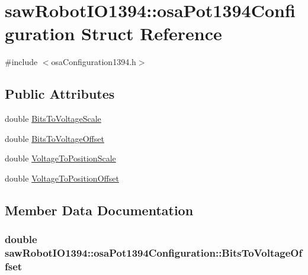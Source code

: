 \hypertarget{structsaw_robot_i_o1394_1_1osa_pot1394_configuration}{}\section{saw\+Robot\+I\+O1394\+:\+:osa\+Pot1394\+Configuration Struct Reference}
\label{structsaw_robot_i_o1394_1_1osa_pot1394_configuration}


{\ttfamily \#include $<$osa\+Configuration1394.\+h$>$}

\subsection*{Public Attributes}
\begin{DoxyCompactItemize}
\item 
double \hyperlink{structsaw_robot_i_o1394_1_1osa_pot1394_configuration_ac5a3c1c05766de6b45c1b5b601c11700}{Bits\+To\+Voltage\+Scale}
\item 
double \hyperlink{structsaw_robot_i_o1394_1_1osa_pot1394_configuration_a0f4fcc3908521910bde14dbe68436833}{Bits\+To\+Voltage\+Offset}
\item 
double \hyperlink{structsaw_robot_i_o1394_1_1osa_pot1394_configuration_adc6b92026b60d4e3dd108a6acc805e4c}{Voltage\+To\+Position\+Scale}
\item 
double \hyperlink{structsaw_robot_i_o1394_1_1osa_pot1394_configuration_a770016798ff462addf14c30b3745f200}{Voltage\+To\+Position\+Offset}
\end{DoxyCompactItemize}


\subsection{Member Data Documentation}
\hypertarget{structsaw_robot_i_o1394_1_1osa_pot1394_configuration_a0f4fcc3908521910bde14dbe68436833}{}
\subsubsection[{Bits\+To\+Voltage\+Offset}]{\setlength{\rightskip}{0pt plus 5cm}double saw\+Robot\+I\+O1394\+::osa\+Pot1394\+Configuration\+::\+Bits\+To\+Voltage\+Offset}\label{structsaw_robot_i_o1394_1_1osa_pot1394_configuration_a0f4fcc3908521910bde14dbe68436833}
\hypertarget{structsaw_robot_i_o1394_1_1osa_pot1394_configuration_ac5a3c1c05766de6b45c1b5b601c11700}{}
